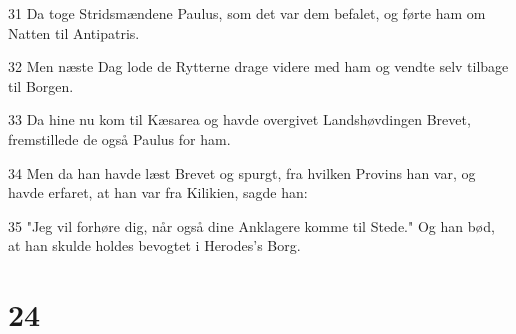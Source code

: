 \par 31 Da toge Stridsmændene Paulus, som det var dem befalet, og førte ham om Natten til Antipatris.
\par 32 Men næste Dag lode de Rytterne drage videre med ham og vendte selv tilbage til Borgen.
\par 33 Da hine nu kom til Kæsarea og havde overgivet Landshøvdingen Brevet, fremstillede de også Paulus for ham.
\par 34 Men da han havde læst Brevet og spurgt, fra hvilken Provins han var, og havde erfaret, at han var fra Kilikien, sagde han:
\par 35 "Jeg vil forhøre dig, når også dine Anklagere komme til Stede." Og han bød, at han skulde holdes bevogtet i Herodes's Borg.

\chapter{24}

